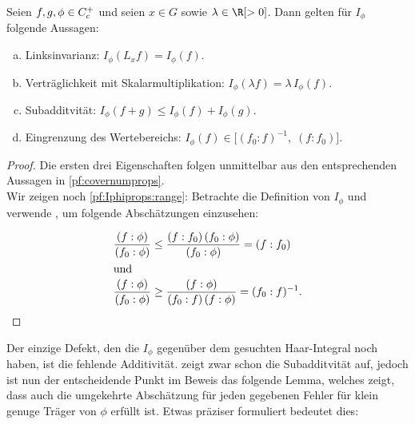 \begin{thLemma}
    \label{pf:Iphiprops}
    Seien $f,g,\phi \in C_c^+$ und seien $x\in G$ sowie $\lambda\in\R[>0]$.
    Dann gelten für $I_\phi$ folgende Aussagen:
    \begin{enumerate}[a)]
        \item\label{pf:Iphiprops:leftinvariance}
            Linksinvarianz:\quad
            $I_\phi(L_xf) = I_\phi(f)$.
        \item\label{pf:Iphiprops:scalarmult}
            Verträglichkeit mit Skalarmultiplikation:\quad
            $I_\phi(\lambda f) = \lambda \, I_\phi(f)$.
        \item\label{pf:Iphiprops:subadditive}
            Subadditvität:\quad
            $I_\phi(f+g) \leq I_\phi(f) + I_\phi(g)$.
        \item\label{pf:Iphiprops:range}
            Eingrenzung des Wertebereichs:\quad
            $I_\phi(f) \in \bigl[ (f_0 : f)^{-1}, \; (f : f_0) \bigr]$.
    \end{enumerate}
\end{thLemma}

\begin{proof}
    Die ersten drei Eigenschaften folgen unmittelbar aus den entsprechenden 
    Aussagen in \cref{pf:covernumprops}.
    \\
    Wir zeigen noch \ref{pf:Iphiprops:range}: Betrachte die Definition von
    $I_\phi$ und verwende , um folgende
    Abschätzungen einzusehen:

    \begin{align*}
        \frac{(f : \phi)}{(f_0 : \phi)} 
        &\leq \frac{(f : f_0)\,(f_0 : \phi)}{(f_0 : \phi)}
        = (f : f_0)
        \\
        \shortintertext{und}
        \frac{(f : \phi)}{(f_0 : \phi)} 
        &\geq \frac{(f : \phi)}{(f_0 : f)\,(f : \phi)}
        = (f_0 : f)^{-1}
        .
    \end{align*}
\end{proof}

Der einzige Defekt, den die $I_\phi$ gegenüber dem gesuchten Haar-Integral noch
haben, ist die fehlende Additivität.  zeigt
zwar schon die Subadditvität auf, jedoch ist nun der entscheidende Punkt im
Beweis das folgende Lemma, welches zeigt, dass auch die umgekehrte Abschätzung
für jeden gegebenen Fehler für klein genuge Träger von $\phi$ erfüllt ist.
Etwas präziser formuliert bedeutet dies:

